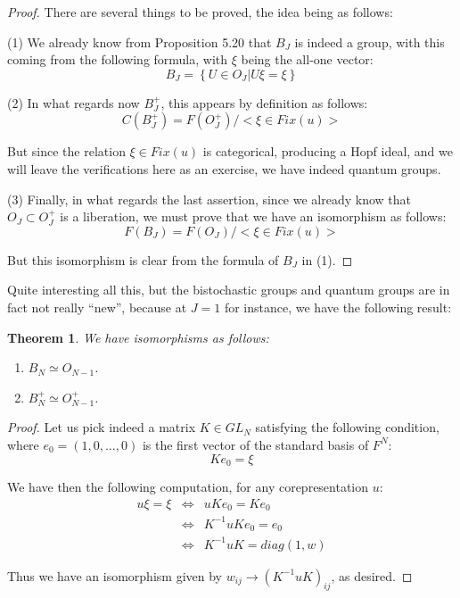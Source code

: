 \documentclass[12pt]{amsbook}
\newtheorem{theorem}{Theorem}[chapter]
\begin{document}
\begin{proof}
There are several things to be proved, the idea being as follows:

\medskip

(1) We already know from Proposition 5.20 that $B_J$ is indeed a group, with this coming from the following formula, with $\xi$ being the all-one vector:
$$B_J=\left\{U\in O_J\Big|U\xi=\xi\right\}$$

(2) In what regards now $B_J^+$, this appears by definition as follows:
$$C(B_J^+)=F(O_J^+)\Big/\Big<\xi\in Fix(u)\Big>$$

But since the relation $\xi\in Fix(u)$ is categorical, producing a Hopf ideal, and we will leave the verifications here as an exercise, we have indeed quantum groups.

\medskip

(3) Finally, in what regards the last assertion, since we already know that $O_J\subset O_J^+$ is a  liberation, we must prove that we have an isomorphism as follows:
$$F(B_J)=F(O_J)\Big/\Big<\xi\in Fix(u)\Big>$$

But this isomorphism is clear from the formula of $B_J$ in (1).
\end{proof}

Quite interesting all this, but the bistochastic groups and quantum groups are in fact not really ``new'', because at $J=1$ for instance, we have the following result:

\begin{theorem}
We have isomorphisms as follows:
\begin{enumerate}
\item $B_N\simeq O_{N-1}$.

\item $B_N^+\simeq O_{N-1}^+$.
\end{enumerate}
\end{theorem}

\begin{proof}
Let us pick indeed a matrix $K\in GL_N$ satisfying the following condition, where $e_0=(1,0,\ldots,0)$ is the first vector of the standard basis of $F^N$:
$$Ke_0=\xi$$

We have then the following computation, for any corepresentation $u$:
\begin{eqnarray*}
u\xi=\xi
&\iff&uKe_0=Ke_0\\
&\iff&K^{-1}uKe_0=e_0\\
&\iff&K^{-1}uK=diag(1,w)
\end{eqnarray*}

Thus we have an isomorphism given by $w_{ij}\to(K^{-1}uK)_{ij}$, as desired.
\end{proof}
\end{document}
